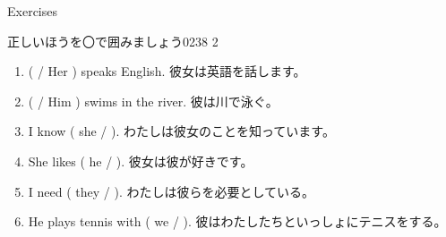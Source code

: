 \documentclass[aspectratio=169,xcolor={dvipsnames,table}]{beamer}
\begin{document}
\begin{frame}[plain]{Exercises}

{\small 正しいほうを〇で囲みましょう}\hfill{\tiny 0238}\,{\scriptsize {}\,2}
 \begin{enumerate}
  \item (  / Her ) speaks English. {\small 彼女は英語を話します。}
  \item (   / Him ) swims in the river. {\small 彼は川で泳ぐ。}
  \item  I know ( she /   ). {\small わたしは彼女のことを知っています。}
  \item She likes ( he /   ). {\small 彼女は彼が好きです。}
  \item I need ( they /   ). {\small わたしは彼らを必要としている。}
  \item He plays tennis with ( we /   ). {\small 彼はわたしたちといっしょにテニスをする。}
 \end{enumerate}

\bigskip

\hfill{}

\end{frame}
\end{document}
